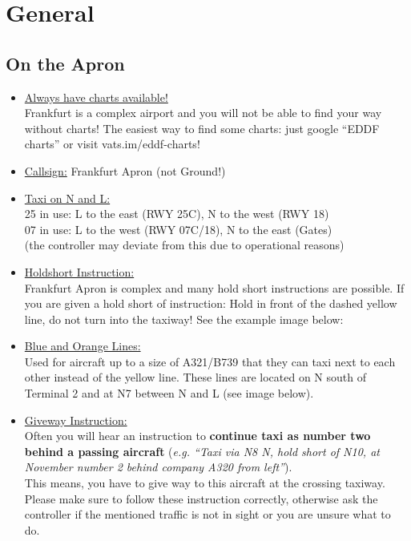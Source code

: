 
\section[general]{General}

\subsection[apron]{On the Apron}

\begin{itemize}
  \item \underline{Always have charts available!}\\ 
    Frankfurt is a complex airport and you will not be able to find your way without charts! 
    The easiest way to find some charts: just google “EDDF charts” or visit vats.im/eddf-charts! 
    
  \item \underline{Callsign:} Frankfurt Apron (not Ground!)
  
  \item \underline{Taxi on N and L:}\\ 
    25 in use: L to the east (RWY 25C), N to the west (RWY 18)\\ 
    07 in use: L to the west (RWY 07C/18), N to the east (Gates)\\
    (the controller may deviate from this due to operational reasons)
    
  \item \underline{Holdshort Instruction:}\\
    Frankfurt Apron is complex and many hold short instructions are possible. 
    If you are given a hold short of instruction: Hold in front of the dashed yellow line, do not turn into the taxiway! See the example image below:
    
    
  \item \underline{Blue and Orange Lines:}\\
    Used for aircraft up to a size of A321/B739 that they can taxi next to each other instead of the yellow line. 
    These lines are located on N south of Terminal 2 and at N7 between N and L (see image below). 
    
    
  \item \underline{Giveway Instruction:}\\
    Often you will hear an instruction to \textbf{continue taxi as number two behind a passing aircraft} 
    (\emph{e.g. “Taxi via N8 N, hold short of N10, at November number 2 behind company A320 from left”}).\\ 
    This means, you have to give way to this aircraft at the crossing taxiway. 
    Please make sure to follow these instruction correctly, otherwise ask the controller if the mentioned traffic is not in 
    sight or you are unsure what to do.
    

\end{itemize}
